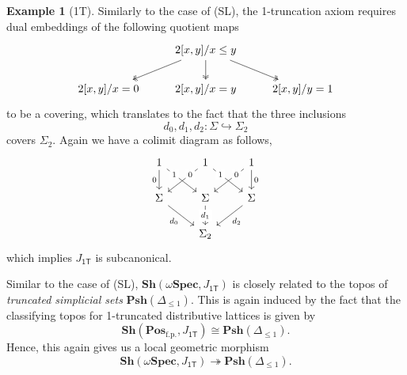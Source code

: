 \documentclass[12pt]{amsart}
\theoremstyle{definition}
\newtheorem{example}[theorem]{Example}
\newcommand{\mb}[1]{\mathbf{#1}}
\newcommand{\mr}[1]{\mathrm{#1}}
\newcommand{\ms}[1]{\mathsf{#1}}
\newcommand{\Pos}{\mb{Pos}}
\newcommand{\sh}{\mb{Sh}}
\newcommand{\psh}{\mb{Psh}}
\newcommand{\surj}{\twoheadrightarrow}
\newcommand{\hook}{\hookrightarrow}
\newcommand{\fp}{_{\mr{f.p.}}}
\newcommand{\cp}{_{\mr{c.p.}}}
\newcommand{\N}{\mb N}
\newcommand{\sFrm}{\sigma\mb{Frm}}
\newcommand{\wSpec}{\omega\mb{Spec}}
\begin{document}
\begin{example}[1T]
  Similarly to the case of (SL), the 1-truncation axiom requires dual embeddings of the following quotient maps
  \[\begin{tikzcd}
    & {2[x,y]/x\le y} \\
    {2[x,y]/x=0} & {2[x,y]/x=y} & {2[x,y]/y=1}
    \arrow[two heads, from=1-2, to=2-1]
    \arrow[two heads, from=1-2, to=2-2]
    \arrow[two heads, from=1-2, to=2-3]
  \end{tikzcd}\]
  to be a covering, which translates to the fact that the three inclusions
  \[ d_0,d_1,d_2 : \Sigma \hook \Sigma_2 \]
  covers $\Sigma_2$. Again we have a colimit diagram as follows, 
  \[\begin{tikzcd}
    1 & 1 & 1 \\
    \Sigma & \Sigma & \Sigma \\
    & {\Sigma_2}
    \arrow["0"', from=1-1, to=2-1]
    \arrow["1"{description, pos=0.25}, from=1-1, to=2-2]
    \arrow["0"{description, pos=0.25}, from=1-2, to=2-1]
    \arrow["1"{description, pos=0.25}, from=1-2, to=2-3]
    \arrow["0"{description, pos=0.25}, from=1-3, to=2-2]
    \arrow["0", from=1-3, to=2-3]
    \arrow["{d_0}"', from=2-1, to=3-2]
    \arrow["{d_1}"{description}, from=2-2, to=3-2]
    \arrow["{d_2}", from=2-3, to=3-2]
  \end{tikzcd}\]
  which implies $J_{\ms{1T}}$ is subcanonical.
  
  Similar to the case of (SL), $\sh(\wSpec,J_{\ms{1T}})$ is closely related to the topos of \emph{truncated simplicial sets} $\psh(\Delta_{\le 1})$. This is again induced by the fact that the classifying topos for 1-truncated distributive lattices is given by 
  \[ \sh(\Pos\fp,J_{\ms{1T}}) \cong \psh(\Delta_{\le 1}). \]
  Hence, this again gives us a local geometric morphism
  \[ \sh(\wSpec,J_{\ms{1T}}) \surj \psh(\Delta_{\le 1}). \]
\end{example}


\end{document}
